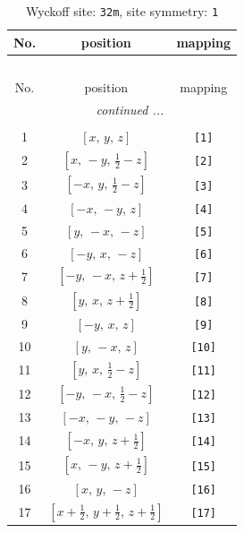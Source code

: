 \documentclass[fleqn,8pt]{jsarticle}
\begin{document}
\renewcommand{\arraystretch}{1.2}
\begin{longtable}{ccc}
\caption{Wyckoff site: {\tt 32m}, site symmetry: {\tt 1}}
 \\
 \hline \hline
No. & position & mapping \\ \hline \endfirsthead

\multicolumn{2}{l}{\tablename\ \thetable{}} \\
 \hline \hline
No. & position & mapping \\ \hline \endhead

 \hline \hline
\multicolumn{2}{r}{\footnotesize\it continued ...} \\ \endfoot

 \hline \hline
\multicolumn{2}{r}{} \\ \endlastfoot

1 & $\left[ x,\, y,\, z \right]$ & {\tt [1]} \\ \hline
2 & $\left[ x,\, - y,\, \frac{1}{2} - z \right]$ & {\tt [2]} \\ \hline
3 & $\left[ - x,\, y,\, \frac{1}{2} - z \right]$ & {\tt [3]} \\ \hline
4 & $\left[ - x,\, - y,\, z \right]$ & {\tt [4]} \\ \hline
5 & $\left[ y,\, - x,\, - z \right]$ & {\tt [5]} \\ \hline
6 & $\left[ - y,\, x,\, - z \right]$ & {\tt [6]} \\ \hline
7 & $\left[ - y,\, - x,\, z + \frac{1}{2} \right]$ & {\tt [7]} \\ \hline
8 & $\left[ y,\, x,\, z + \frac{1}{2} \right]$ & {\tt [8]} \\ \hline
9 & $\left[ - y,\, x,\, z \right]$ & {\tt [9]} \\ \hline
10 & $\left[ y,\, - x,\, z \right]$ & {\tt [10]} \\ \hline
11 & $\left[ y,\, x,\, \frac{1}{2} - z \right]$ & {\tt [11]} \\ \hline
12 & $\left[ - y,\, - x,\, \frac{1}{2} - z \right]$ & {\tt [12]} \\ \hline
13 & $\left[ - x,\, - y,\, - z \right]$ & {\tt [13]} \\ \hline
14 & $\left[ - x,\, y,\, z + \frac{1}{2} \right]$ & {\tt [14]} \\ \hline
15 & $\left[ x,\, - y,\, z + \frac{1}{2} \right]$ & {\tt [15]} \\ \hline
16 & $\left[ x,\, y,\, - z \right]$ & {\tt [16]} \\ \hline
17 & $\left[ x + \frac{1}{2},\, y + \frac{1}{2},\, z + \frac{1}{2} \right]$ & {\tt [17]} \\ \hline

\end{longtable}
\end{document}
